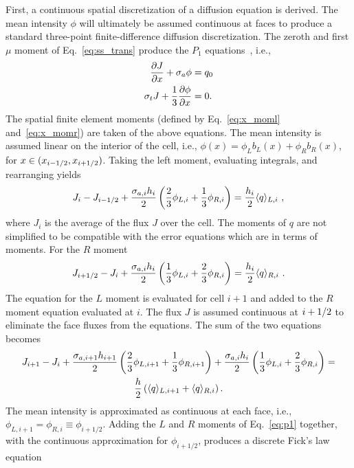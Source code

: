 First, a continuous spatial discretization of a diffusion equation is derived.  
The mean intensity $\phi$ will ultimately be assumed continuous at faces to produce a
standard three-point finite-difference diffusion discretization. 
The zeroth and first $\mu$ moment of Eq.~\eqref{eq:ss_trans} produce the $P_1$
equations~\cite{lewis,wla_thesis}, i.e., 
\begin{align}\label{eq:dsa_bal}
    \frac{\partial J}{\partial x} + \sigma_a \phi &= q_0 \\ \label{eq:p1}
    \sigma_t J + \frac{1}{3} \frac{\partial \phi}{\partial x} &= 0.
\end{align}
The spatial finite element moments (defined by Eq.~\eqref{eq:x_moml} and~\eqref{eq:x_momr})
are taken of the above equations. 
The mean intensity is assumed linear on the interior of the cell, i.e.,
$\phi(x)=\phi_Lb_L(x) + \phi_Rb_R(x)$, for $x\in({x_{i-1/2}},{x_{i+1/2}})$.   Taking the left moment,
evaluating integrals, and rearranging yields
\begin{equation}
    J_{i} - J_{{i-1/2}}  + \frac{\sigma_{a,i}h_i}{2} \left(\frac{2}{3} \phi_{L,i} + \frac{1}{3}
    \phi_{R,i} \right) = \frac{h_i}{2} \langle q \rangle_{L,i}\,\,,
\end{equation}
where $J_i$ is the average of the flux $J$ over the cell. The moments of $q$ are
not simplified to be compatible with the error equations which are in terms of moments. For the $R$ moment
\begin{equation}
    J_{i+1/2} - J_{i}  + \frac{\sigma_{a,i}h_i}{2} \left(\frac{1}{3} \phi_{L,i} + \frac{2}{3}
    \phi_{R,i} \right) = \frac{h_i}{2} \langle q \rangle_{R,i}\,\,.
\end{equation}
The equation for the $L$ moment is evaluated for cell $i+1$ and added to the $R$ moment
equation evaluated at $i$.  The flux $J$ is assumed continuous at ${i+1/2}$ to eliminate
the face fluxes from the equations.  The sum of the two equations becomes
\begin{multline}\label{eq:diff_noclose}
    J_{i+1} - J_{i} + \frac{\sigma_{a,i+1} h_{i+1}}{2}\left(\frac{2}{3} \phi_{L,i+1} +
    \frac{1}{3}\phi_{R,i+1}\right) + \frac{\sigma_{a,i} h_i}{2} \left( \frac{1}{3} \phi_{L,i} +
    \frac{2}{3}\phi_{R,i}\right) =\\ \frac{h}{2} \left(\langle q \rangle_{L,i+1} + \langle q \rangle_{R,i}
    \right).
\end{multline}
The mean intensity is approximated as continuous at each face, i.e., $\phi_{L,i+1} = \phi_{R,i}
\equiv \phi_{i+1/2}$.  Adding the $L$ and $R$ moments of Eq.~\eqref{eq:p1} together, with
the continuous approximation for $\phi_{i+1/2}$, produces a discrete Fick's law equation~\cite{stacy}
